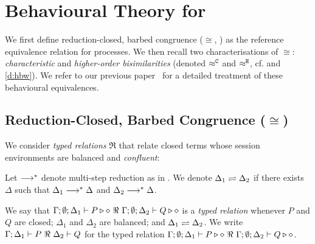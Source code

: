 \documentclass[runningheads]{llncs}
\begin{document}
{%

\section{Behavioural Theory for \HOp}\label{sec:bt}
%

We first define reduction-closed, barbed congruence ($\cong$, ) as the
reference equivalence relation for \HOp processes.
We then recall two characterisations of $\cong$:
\emph{characteristic} and
\emph{higher-order bisimilarities}   
 (denoted $\approx^\mathtt{C}$ and $\approx^\mathtt{H}$, cf.  and \ref{d:hbw}). 
 We refer to our previous paper~\cite{KouzapasPY17} for a detailed treatment of these behavioural equivalences. 

\subsection{Reduction-Closed, Barbed Congruence ($\cong$)}
\label{subsec:rc}

We consider \emph{typed relations} $\Re$ that relate  closed terms whose
session environments %
are balanced  and \emph{confluent}:

\begin{definition}
Let $\longrightarrow^\ast$ denote multi-step reduction as in .
	We denote $\Delta_1 \rightleftharpoons \Delta_2$ if there exists $\Delta$ such that
	$\Delta_1 \longrightarrow^\ast \Delta$ and $\Delta_2 \longrightarrow^\ast \Delta$.
\end{definition}



\begin{definition}
	We say that
	$\Gamma; \emptyset; \Delta_1 \vdash P \triangleright \diamond\ \Re \ \Gamma; \emptyset; \Delta_2 \vdash Q \triangleright \diamond$
	is a {\em typed relation} whenever
	$P$ and $Q$ are closed;
	$\Delta_1$ and $\Delta_2$ are balanced; and 
	$\Delta_1 \rightleftharpoons \Delta_2$.
	We write $\horel{\Gamma}{\Delta_1}{P}{\ \Re \ }{\Delta_2}{Q}$
	for the typed relation $\Gamma; \emptyset; \Delta_1 \vdash P \triangleright \diamond\ \Re \ \Gamma; \emptyset; \Delta_2 \vdash Q \triangleright \diamond$.
\end{definition}

}
\end{document}
